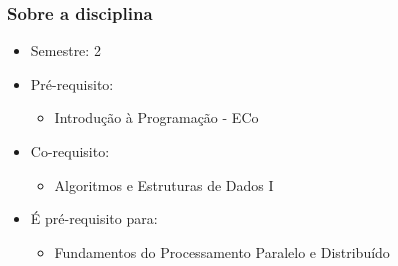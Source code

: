 \documentclass[aspectratio=169]{beamer}
\begin{document}
\begin{frame}\frametitle{Sobre a disciplina}
\begin{itemize}
	\item Semestre: 2
	\item Pré-requisito:
		\begin{itemize}
			\item Introdução à Programação - ECo
		\end{itemize}
	\item Co-requisito:
		\begin{itemize}
			\item Algoritmos e Estruturas de Dados I
		\end{itemize}
	\item É pré-requisito para:
		\begin{itemize}
			\item Fundamentos do Processamento Paralelo e Distribuído
		\end{itemize}
\end{itemize}
\end{frame}

{%
\begin{frame}\frametitle{}
\end{frame}
}
\end{document}
